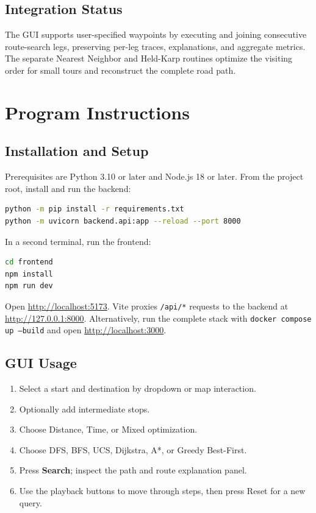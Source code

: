 \documentclass[12pt,a4paper,oneside]{report}
\newcommand{\code}[1]{\texttt{#1}}
\begin{document}
\section{Integration Status}
The GUI supports user-specified waypoints by executing and joining consecutive
route-search legs, preserving per-leg traces, explanations, and aggregate
metrics. The separate Nearest Neighbor and Held-Karp routines optimize the
visiting order for small tours and reconstruct the complete road path.

\chapter{Program Instructions}

\section{Installation and Setup}
Prerequisites are Python 3.10 or later and Node.js 18 or later. From the project
root, install and run the backend:

\begin{lstlisting}[language=bash,caption={Backend setup}]
python -m pip install -r requirements.txt
python -m uvicorn backend.api:app --reload --port 8000
\end{lstlisting}

In a second terminal, run the frontend:
\begin{lstlisting}[language=bash,caption={Frontend setup}]
cd frontend
npm install
npm run dev
\end{lstlisting}

Open \url{http://localhost:5173}. Vite proxies \code{/api/*} requests to the
backend at \url{http://127.0.0.1:8000}. Alternatively, run the complete stack
with \code{docker compose up --build} and open \url{http://localhost:3000}.

\section{GUI Usage}
\begin{enumerate}
\item Select a start and destination by dropdown or map interaction.
\item Optionally add intermediate stops.
\item Choose Distance, Time, or Mixed optimization.
\item Choose DFS, BFS, UCS, Dijkstra, A*, or Greedy Best-First.
\item Press \textbf{Search}; inspect the path and route explanation panel.
\item Use the playback buttons to move through steps, then press Reset for a new query.
\end{enumerate}
\end{document}
